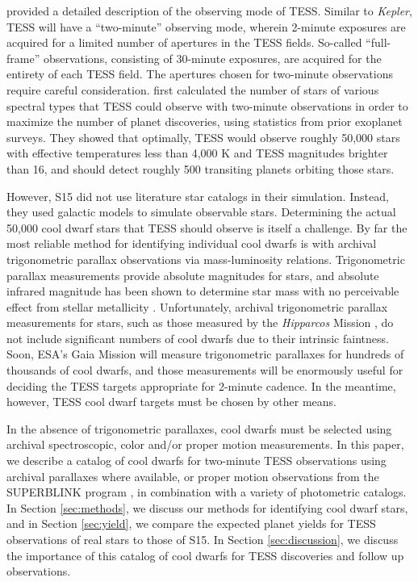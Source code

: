 \documentclass[twocolumn]{aastex62}
\begin{document}
\citet[][]{Ricker2014} provided a detailed description of the observing mode of TESS.  Similar to {\it Kepler}, TESS will have a ``two-minute'' observing mode, wherein 2-minute exposures are acquired for a limited number of apertures in the TESS fields.  So-called ``full-frame'' observations, consisting of 30-minute exposures, are acquired for the entirety of each TESS field.  The apertures chosen for two-minute observations require careful consideration.  \citet[][hereafter S15]{Sullivan2015} first calculated the number of stars of various spectral types that TESS could observe with two-minute observations in order to maximize the number of planet discoveries, using statistics from prior exoplanet surveys.  They showed that optimally, TESS would observe roughly 50,000 stars with effective temperatures less than 4,000 K and TESS magnitudes brighter than 16, and should detect roughly 500 transiting planets orbiting those stars.


However, S15 did not use literature star catalogs in their simulation.  Instead, they used galactic models to simulate observable stars.  Determining the actual 50,000 cool dwarf stars that TESS should observe is itself a challenge.  By far the most reliable method for identifying individual cool dwarfs is with archival trigonometric parallax observations via mass-luminosity relations.  Trigonometric parallax measurements provide absolute magnitudes for stars, and absolute infrared magnitude has been shown to determine star mass with no perceivable effect from stellar metallicity \citep[e.g.][]{Henry1993, Henry1999, Delfosse2000, Boyajian2012, Mann2013c, Benedict2016}.  Unfortunately, archival trigonometric parallax measurements for stars, such as those measured by the {\it Hipparcos} Mission \citep[][]{vanleeuwen2007}, do not include significant numbers of cool dwarfs due to their intrinsic faintness.  Soon, ESA's Gaia Mission will measure trigonometric parallaxes for hundreds of thousands of cool dwarfs, and those measurements will be enormously useful for deciding the TESS targets appropriate for 2-minute cadence.  In the meantime, however, TESS cool dwarf targets must be chosen by other means.


In the absence of trigonometric parallaxes, cool dwarfs must be selected using archival spectroscopic, color and/or proper motion measurements.  In this paper, we describe a catalog of cool dwarfs for two-minute TESS observations using  archival parallaxes where available, or proper motion observations from the SUPERBLINK program \citep[][]{Lepine2011}, in combination with a variety of photometric catalogs.  In Section \ref{sec:methods}, we discuss our methods for identifying cool dwarf stars, and in Section \ref{sec:yield}, we compare the expected planet yields for TESS observations of real stars to those of S15.  In Section \ref{sec:discussion}, we discuss the importance of this catalog of cool dwarfs for TESS discoveries and follow up observations.
\end{document}

